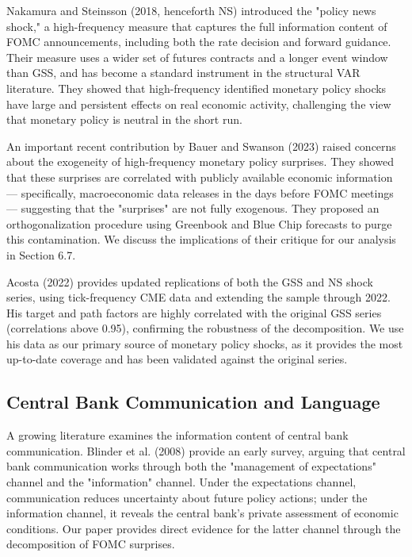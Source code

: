 Nakamura and Steinsson (2018, henceforth NS) introduced the "policy news shock," a high-frequency measure that captures the full information content of FOMC announcements, including both the rate decision and forward guidance. Their measure uses a wider set of futures contracts and a longer event window than GSS, and has become a standard instrument in the structural VAR literature. They showed that high-frequency identified monetary policy shocks have large and persistent effects on real economic activity, challenging the view that monetary policy is neutral in the short run.

An important recent contribution by Bauer and Swanson (2023) raised concerns about the exogeneity of high-frequency monetary policy surprises. They showed that these surprises are correlated with publicly available economic information --- specifically, macroeconomic data releases in the days before FOMC meetings --- suggesting that the "surprises" are not fully exogenous. They proposed an orthogonalization procedure using Greenbook and Blue Chip forecasts to purge this contamination. We discuss the implications of their critique for our analysis in Section 6.7.

Acosta (2022) provides updated replications of both the GSS and NS shock series, using tick-frequency CME data and extending the sample through 2022. His target and path factors are highly correlated with the original GSS series (correlations above 0.95), confirming the robustness of the decomposition. We use his data as our primary source of monetary policy shocks, as it provides the most up-to-date coverage and has been validated against the original series.

\subsection{Central Bank Communication and Language}

A growing literature examines the information content of central bank communication. Blinder et al. (2008) provide an early survey, arguing that central bank communication works through both the "management of expectations" channel and the "information" channel. Under the expectations channel, communication reduces uncertainty about future policy actions; under the information channel, it reveals the central bank's private assessment of economic conditions. Our paper provides direct evidence for the latter channel through the decomposition of FOMC surprises.

